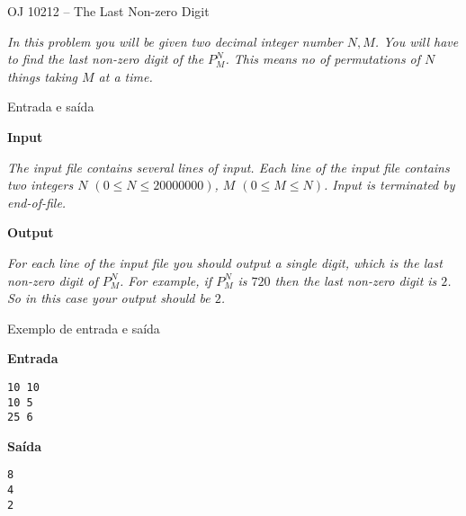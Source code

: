 \begin{frame}[fragile]{OJ 10212 -- The Last Non-zero Digit}

{\it
In this problem you will be given two decimal integer number $N, M$. You will have to find the last
non-zero digit of the $P_M^N$. This means no of permutations of $N$ things taking $M$ at a time.
}

\end{frame}

\begin{frame}[fragile]{Entrada e saída}

\textbf{Input}

{\it The input file contains several lines of input. Each line of the input file contains two integers $N$
$(0 \leq N \leq 20000000)$, $M$ $(0 \leq M \leq N)$. Input is terminated by end-of-file.}

\vspace{0.3in}


\textbf{Output}

{\it For each line of the input file you should output a single digit, which is the last non-zero digit of $P_M^N$.
For example, if $P_M^N$
is $720$ then the last non-zero digit is $2$. So in this case your output should be $2$.}

\end{frame}

\begin{frame}[fragile]{Exemplo de entrada e saída}

\begin{minipage}[t]{0.45\textwidth}
\textbf{Entrada}
\begin{verbatim}
10 10
10 5
25 6
\end{verbatim}
\end{minipage}
\begin{minipage}[t]{0.5\textwidth}
\textbf{Saída}
\begin{verbatim}
8
4
2
\end{verbatim}
\end{minipage}

\end{frame}



